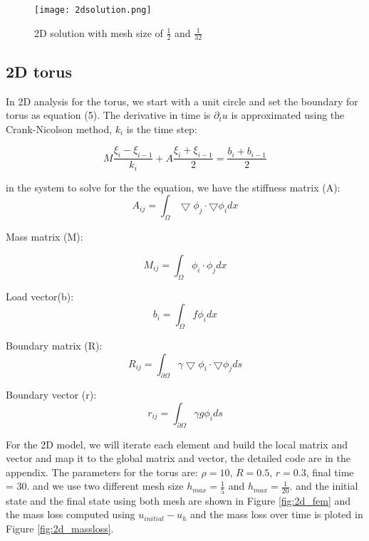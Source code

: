 \documentclass[12pt]{article}
\begin{document}
\begin{figure}[H] %
\centering
\texttt{[image: 2dsolution.png]}
\caption{2D solution with mesh size of $\frac{1}{2}$ and $\frac{1}{32}$}
\label{fig:2d_solution}
\end{figure}

\subsection{2D torus}
In 2D analysis for the torus, we start with a unit circle and set the boundary for torus as equation (5). The derivative in time is $\partial _t u$ is approximated using the Crank-Nicolson method, $k_i$ is the time step: 

\begin{equation}
	M \frac{\xi_i - \xi_{i-1}}{k_i} + A \frac{\xi_i + \xi_{i-1}}{2} = \frac{b_i + b_{i-1}}{2}
\end{equation}

in the system to solve for the the equation, we have the stiffness matrix (A):
\begin{equation}
	A_{ij} = \int_{\Omega} \bigtriangledown \phi _j \cdot \bigtriangledown \phi _i dx
\end{equation}

Mass matrix (M):

\begin{equation}
	M_{ij} = \int_{\Omega}  \phi _i \cdot  \phi _j dx
\end{equation}

Load vector(b):
\begin{equation}
	b_{i} = \int_{\Omega}  f  \phi _i dx
\end{equation}

Boundary matrix (R):
\begin{equation}
	R_{ij} = \int_{\partial \Omega}  \gamma \bigtriangledown \phi _i \cdot  \bigtriangledown \phi _j ds
\end{equation}

Boundary vector (r):
\begin{equation}
	r_{ij} = \int_{\partial \Omega}  \gamma g \phi _i ds
\end{equation}

For the 2D model, we will iterate each element and build the local matrix and vector and map it to the global matrix and vector, the detailed code are in the appendix. The parameters for the torus are: $\rho = 10$, $R = 0.5$, $r = 0.3$, final time = 30. and we use two different mesh size $h_{max} = \frac{1}{5}$ and $h_{max} = \frac{1}{20}$. and the initial state and the final state using both mesh are shown in Figure \ref{fig:2d_fem} and the mass loss computed using $u_{initial} - u_h$ and the mass loss over time is ploted in Figure \ref{fig:2d_massloss}. \par
\end{document}
